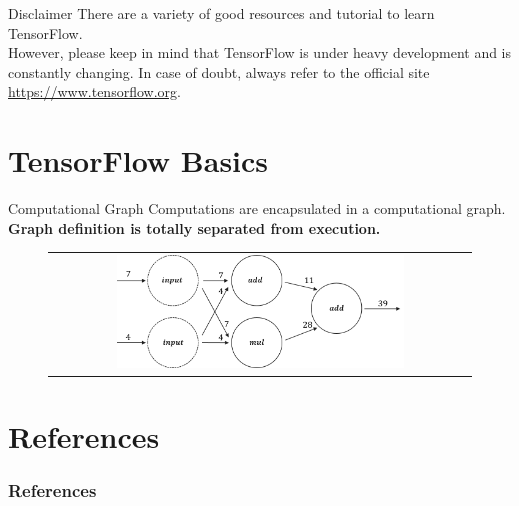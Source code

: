 \documentclass[aspectratio=169]{beamer}
\begin{document}

\begin{frame}{Disclaimer}
There are a variety of good resources and tutorial to learn TensorFlow.\\
\vspace{0.5cm}
However, please keep in mind that TensorFlow is under heavy development and is constantly changing. In case of doubt, always refer to the official site \url{https://www.tensorflow.org}.
\end{frame}


\section{TensorFlow Basics}

\begin{frame}{Computational Graph}
Computations are encapsulated in a computational graph.\\
\vspace{0.5cm}
\textbf{Graph definition is totally separated from execution.}\vspace{0.5cm}
\begin{figure}
\begin{tabular}{c}
	\includegraphics[width=0.7\textwidth]{img/tf/computational_graph.png}
\end{tabular}
\end{figure}
\end{frame}


\begin{frame}
\cite{tensorflow2015-whitepaper}
\end{frame}

\section{References}

\begin{frame}[t, allowframebreaks]
\frametitle{References}


\end{frame}
\end{document}
